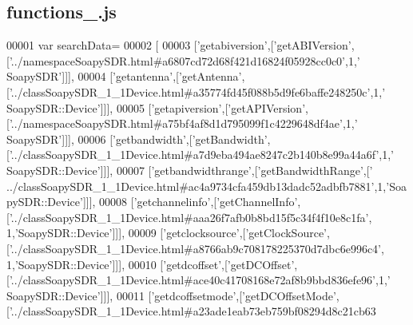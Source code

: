 \subsection{functions\+\_.\+js}
\label{functions__5_8js_source}

\begin{DoxyCode}
00001 var searchData=
00002 [
00003   [\textcolor{stringliteral}{'getabiversion'},[\textcolor{stringliteral}{'getABIVersion'},[\textcolor{stringliteral}{'../namespaceSoapySDR.html#a6807cd72d68f421d16824f05928cc0c0'},1,\textcolor{stringliteral}{'
      SoapySDR'}]]],
00004   [\textcolor{stringliteral}{'getantenna'},[\textcolor{stringliteral}{'getAntenna'},[\textcolor{stringliteral}{'../classSoapySDR\_1\_1Device.html#a35774fd45f088b5d9fe6baffe248250c'},1,\textcolor{stringliteral}{'
      SoapySDR::Device'}]]],
00005   [\textcolor{stringliteral}{'getapiversion'},[\textcolor{stringliteral}{'getAPIVersion'},[\textcolor{stringliteral}{'../namespaceSoapySDR.html#a75bf4af8d1d795099f1c4229648df4ae'},1,\textcolor{stringliteral}{'
      SoapySDR'}]]],
00006   [\textcolor{stringliteral}{'getbandwidth'},[\textcolor{stringliteral}{'getBandwidth'},[\textcolor{stringliteral}{'../classSoapySDR\_1\_1Device.html#a7d9eba494ae8247c2b140b8e99a44a6f'},1,\textcolor{stringliteral}{'
      SoapySDR::Device'}]]],
00007   [\textcolor{stringliteral}{'getbandwidthrange'},[\textcolor{stringliteral}{'getBandwidthRange'},[\textcolor{stringliteral}{'
      ../classSoapySDR\_1\_1Device.html#ac4a9734cfa459db13dadc52adbfb7881'},1,\textcolor{stringliteral}{'SoapySDR::Device'}]]],
00008   [\textcolor{stringliteral}{'getchannelinfo'},[\textcolor{stringliteral}{'getChannelInfo'},[\textcolor{stringliteral}{'../classSoapySDR\_1\_1Device.html#aaa26f7afb0b8bd15f5c34f4f10e8c1fa'},
      1,\textcolor{stringliteral}{'SoapySDR::Device'}]]],
00009   [\textcolor{stringliteral}{'getclocksource'},[\textcolor{stringliteral}{'getClockSource'},[\textcolor{stringliteral}{'../classSoapySDR\_1\_1Device.html#a8766ab9c708178225370d7dbc6e996c4'},
      1,\textcolor{stringliteral}{'SoapySDR::Device'}]]],
00010   [\textcolor{stringliteral}{'getdcoffset'},[\textcolor{stringliteral}{'getDCOffset'},[\textcolor{stringliteral}{'../classSoapySDR\_1\_1Device.html#ace40c41708168e72af8b9bbd836efe96'},1,\textcolor{stringliteral}{'
      SoapySDR::Device'}]]],
00011   [\textcolor{stringliteral}{'getdcoffsetmode'},[\textcolor{stringliteral}{'getDCOffsetMode'},[\textcolor{stringliteral}{'../classSoapySDR\_1\_1Device.html#a23ade1eab73eb759bf08294d8c21cb63
}
\end{DoxyCode}
